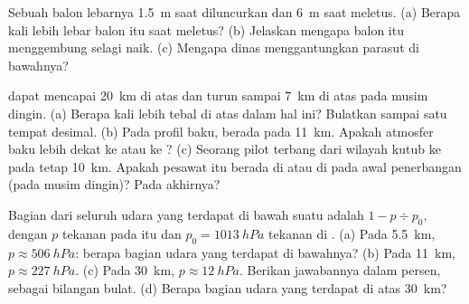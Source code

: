 \begin{exercise}[$\star\star$]\label{exo:g8:the-atmosphere:9}
Sebuah balon  lebarnya \qty{1.5}{m} saat diluncurkan dan \qty{6}{m}
saat meletus. (a) Berapa kali lebih lebar balon itu saat meletus?
(b) Jelaskan mengapa balon itu menggembung selagi naik. (c) Mengapa dinas
 menggantungkan parasut di bawahnya?
\end{exercise}

\begin{exercise}[$\star\star$]\label{exo:g8:the-atmosphere:10}
 dapat mencapai \qty{20}{km} di atas  dan turun
sampai \qty{7}{km} di atas  pada musim dingin. (a) Berapa kali lebih
tebal  di atas  dalam hal ini? Bulatkan sampai satu
tempat desimal. (b) Pada profil baku,  berada pada \qty{11}{km}.
Apakah atmosfer baku lebih dekat ke  atau ke ? (c) Seorang
pilot terbang dari wilayah kutub ke  pada  tetap
\qty{10}{km}. Apakah pesawat itu berada di  atau di 
pada awal penerbangan (pada musim dingin)? Pada akhirnya?
\end{exercise}

\begin{exercise}[$\star\star\star$]\label{exo:g8:the-atmosphere:11}
Bagian dari seluruh udara yang terdapat di bawah suatu  adalah
$1 - p \div
p_0$, dengan $p$ tekanan pada  itu dan $p_0 =
\qty{1013}{hPa}$ tekanan di . (a) Pada \qty{5.5}{km}, $p
\approx \qty{506}{hPa}$: berapa bagian udara yang terdapat di bawahnya?
(b) Pada \qty{11}{km}, $p \approx \qty{227}{hPa}$. (c) Pada \qty{30}{km},
$p \approx
\qty{12}{hPa}$. Berikan jawabannya dalam persen, sebagai bilangan bulat. (d) Berapa bagian udara yang terdapat di atas \qty{30}{km}?
\end{exercise}

